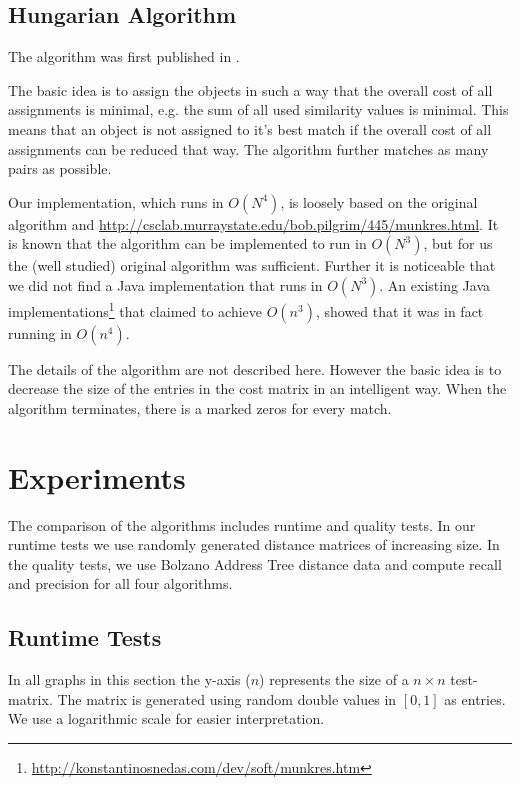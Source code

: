 \documentclass[a4paper,11pt]{article}
\begin{document}
\subsection{Hungarian Algorithm}

The algorithm was first published in \cite{ha_firstpub}.

The basic idea is to assign the objects in such a way that the overall cost of all assignments is minimal, e.g. the sum of all used similarity values is minimal. This means that an object is not assigned to it's best match if the overall cost of all assignments can be reduced that way. The algorithm further matches as many pairs as possible.

Our implementation, which runs in $O(N^4)$, is loosely based on the original algorithm and  \url{http://csclab.murraystate.edu/bob.pilgrim/445/munkres.html}. It is known that the algorithm can be implemented to run in $O(N^3)$, but for us the (well studied) original algorithm was sufficient. Further it is noticeable that we did not find a Java implementation that runs in $O(N^3)$. An existing Java implementations\footnote{\url{http://konstantinosnedas.com/dev/soft/munkres.htm}} that claimed to achieve $O(n^{3})$, showed that it was in fact running in $O(n^{4})$.

The details of the algorithm are not described here. However the basic idea is to decrease the size of the entries in the cost matrix in an intelligent way. When the algorithm terminates, there is a marked zeros for every match. 

\section{Experiments}

The comparison of the algorithms includes runtime and quality tests. In our runtime tests we use randomly generated distance matrices of increasing size. In the quality tests, we use Bolzano Address Tree distance data and compute recall and precision for all four algorithms.

\subsection{Runtime Tests}

In all graphs in this section the y-axis ($n$) represents the size of a $n \times n$ test-matrix. The matrix is generated using random double values in $[0,1]$ as entries. We use a logarithmic scale for easier interpretation.
\end{document}

